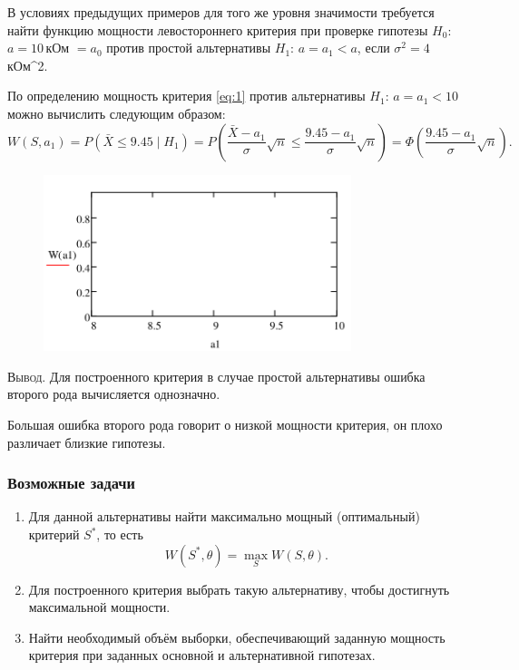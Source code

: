 \begin{ex}
	В условиях предыдущих примеров для того же уровня значимости требуется найти
	функцию мощности левостороннего критерия при проверке гипотезы $ H_0 $: $ a =
	10$\,кОм $ = a_0 $ против простой альтернативы $ H_1 $: $ a = a_1 < a $, если
	$ \sigma^2 = 4 $\,кОм^2.
\begin{solution}
	По определению мощность критерия \eqref{eq:1} против альтернативы $ H_1 $: $ a
	= a_1 < 10$ можно вычислить следующим образом: 
	\[
			W(S, a_1) = P(\bar X \leqslant 9.45\mid H_1) = P \left( \frac{\bar X -
			a_1}{\sigma} \sqrt n \leqslant \frac{9.45 - a_1}{\sigma} \sqrt n \right) =
			\Phi  \left( \frac{9.45 - a_1}{\sigma}\sqrt n \right).
	\]
	\begin{figure}[h!]
		\centering
		\includegraphics[width=0.8\textwidth]{Figures/9-plot2.png}
		\caption{}
		\label{fig:9-plot2}
	\end{figure}

\end{solution}
\end{ex}

\textsc{Вывод}.
Для построенного критерия в случае простой альтернативы ошибка второго рода 
вычисляется однозначно. 

 Большая ошибка второго рода говорит о низкой мощности критерия, он плохо различает 
близкие гипотезы. 

\subsubsection{Возможные задачи}
\begin{enumerate}
	\item Для данной альтернативы найти максимально мощный (оптимальный) критерий
		$ S^\ast $, то есть  
		\[
				W(S^\ast, \theta) = \max_S W(S,\theta).
		\]
	\item Для построенного критерия выбрать такую альтернативу, чтобы достигнуть
		максимальной мощности.
	\item Найти необходимый объём выборки, обеспечивающий заданную мощность
		критерия при заданных основной и альтернативной гипотезах.
\end{enumerate}


